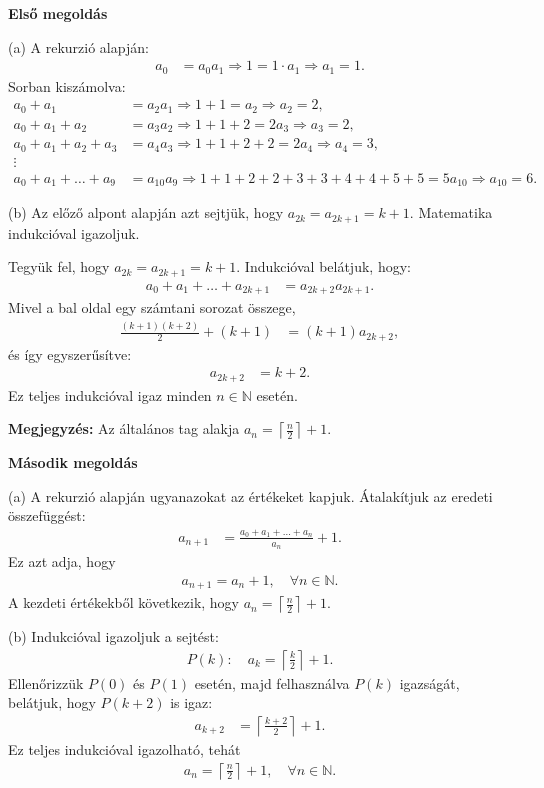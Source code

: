 \begin{solution}
\textbf{Első megoldás}

(a) A rekurzió alapján: 
\begin{align*}
a_{0} & =a_{0}a_{1}\Rightarrow1=1\cdot a_{1}\Rightarrow a_{1}=1.
\end{align*}
Sorban kiszámolva: 
\begin{align*}
a_{0}+a_{1} & =a_{2}a_{1}\Rightarrow1+1=a_{2}\Rightarrow a_{2}=2,\\
a_{0}+a_{1}+a_{2} & =a_{3}a_{2}\Rightarrow1+1+2=2a_{3}\Rightarrow a_{3}=2,\\
a_{0}+a_{1}+a_{2}+a_{3} & =a_{4}a_{3}\Rightarrow1+1+2+2=2a_{4}\Rightarrow a_{4}=3,\\
\vdots\\
a_{0}+a_{1}+\dots+a_{9} & =a_{10}a_{9}\Rightarrow1+1+2+2+3+3+4+4+5+5=5a_{10}\Rightarrow a_{10}=6.
\end{align*}

(b) Az előző alpont alapján azt sejtjük, hogy $a_{2k}=a_{2k+1}=k+1$.
Matematika indukcióval igazoljuk.

Tegyük fel, hogy $a_{2k}=a_{2k+1}=k+1$. Indukcióval belátjuk, hogy:
\begin{align*}
a_{0}+a_{1}+\dots+a_{2k+1} & =a_{2k+2}a_{2k+1}.
\end{align*}
Mivel a bal oldal egy számtani sorozat összege, 
\begin{align*}
\frac{(k+1)(k+2)}{2}+(k+1) & =(k+1)a_{2k+2},
\end{align*}
és így egyszerűsítve: 
\begin{align*}
a_{2k+2} & =k+2.
\end{align*}
Ez teljes indukcióval igaz minden $n\in\mathbb{N}$ esetén.

\textbf{Megjegyzés:} Az általános tag alakja $a_{n}=\left\lceil \frac{n}{2}\right\rceil +1$. 
\end{solution}
%
\begin{solution}
\textbf{Második megoldás}

(a) A rekurzió alapján ugyanazokat az értékeket kapjuk. Átalakítjuk
az eredeti összefüggést: 
\begin{align*}
a_{n+1} & =\frac{a_{0}+a_{1}+\dots+a_{n}}{a_{n}}+1.
\end{align*}
Ez azt adja, hogy 
\begin{align*}
a_{n+1}=a_{n}+1,\quad\forall n\in\mathbb{N}.
\end{align*}
A kezdeti értékekből következik, hogy $a_{n}=\left\lceil \frac{n}{2}\right\rceil +1$.

(b) Indukcióval igazoljuk a sejtést: 
\begin{align*}
P(k):\quad a_{k}=\left\lceil \frac{k}{2}\right\rceil +1.
\end{align*}
Ellenőrizzük $P(0)$ és $P(1)$ esetén, majd felhasználva $P(k)$
igazságát, belátjuk, hogy $P(k+2)$ is igaz: 
\begin{align*}
a_{k+2} & =\left\lceil \frac{k+2}{2}\right\rceil +1.
\end{align*}
Ez teljes indukcióval igazolható, tehát 
\begin{align*}
a_{n}=\left\lceil \frac{n}{2}\right\rceil +1,\quad\forall n\in\mathbb{N}.
\end{align*}
\end{solution}
